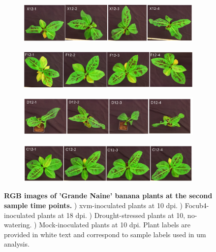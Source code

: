 \begin{figure}[ph!]
    \centering
    \begin{subfigure}[b]{\textwidth}
        \includegraphics[width=\textwidth]{Figures/SecondTimePointXanthomonasBLQs.pdf}
        \caption{}
        \label{fig:XvmSecondTimeBLQs}
    \end{subfigure}
     \begin{subfigure}[b]{\textwidth}
        \includegraphics[width=\textwidth]{Figures/SecondTimePointFusariumBLQs.pdf}
        \caption{}
        \label{fig:FocSecondTimeBLQs}
    \end{subfigure}
         \begin{subfigure}[b]{\textwidth}
        \includegraphics[width=\textwidth]{Figures/SecondTimePointDroughtBLQs.pdf}
        \caption{}
        \label{fig:DroSecondTimeBLQs}
    \end{subfigure}
         \begin{subfigure}[b]{\textwidth}
        \includegraphics[width=\textwidth]{Figures/SecondTimePointControlBLQs.pdf}
        \caption{}
        \label{fig:ConSecondTimeBLQs}
    \end{subfigure}
    \caption[RGB images of 'Grande Naine' banana plants at the second sample time points.]{\textbf{RGB images of 'Grande Naine' banana plants at the second sample time points.}
    \textbf{}) \acl{xvm}-inoculated plants at 10 \acl{dpi}.
    \textbf{}) \acl{Focub4}-inoculated plants at 18 \acl{dpi}.
    \textbf{}) Drought-stressed plants at 10, no-watering.
    \textbf{}) Mock-inoculated plants at 10 \ac{dpi}.
    Plant labels are provided in white text and correspond to sample labels used in \acl{um} analysis.
    }
    \label{fig:SecondTimePointSymptoms}
\end{figure}

